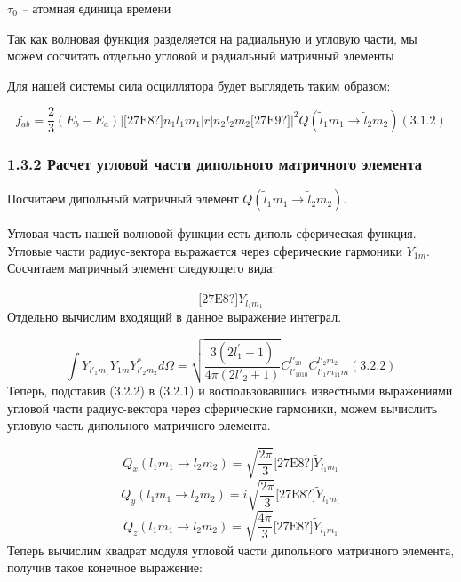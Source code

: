 \documentclass[a4paper]{article}
\begin{document}
 $\tau _0$\textit{ -- }атомная
единица времени

Так как волновая функция разделяется на радиальную и угловую части, мы можем сосчитать отдельно угловой и радиальный матричный элементы

Для нашей системы сила осциллятора будет выглядеть таким образом:

\begin{equation*}
f_{\mathit{ab}}=\frac 2
3\left(E_b-E_a\right)\left|\text{[27E8?]}n_1l_1m_1\left|r\left|n_2l_2m_2\text{[27E9?]}\right.\right.\right|^2Q\left(\widetilde
l_1m_1\rightarrow \widetilde l_2m_2\right)(3.1.2)
\end{equation*}
\subsubsection[1.3.2 Расчет угловой
части дипольного матричного
элемента]{1.3.2 Расчет
угловой части дипольного матричного
элемента}
\hypertarget{RefHeading4691463868395}{}Посчитаем
дипольный матричный
элемент  $Q\left(\widetilde l_1m_1\rightarrow \widetilde l_2m_2\right)$.

Угловая часть нашей волновой функции есть диполь-сферическая функция. Угловые части радиус-вектора выражается через сферические
гармоники  $Y_{1m}$.
Сосчитаем матричный элемент следующего вида:

\begin{equation*}
\text{[27E8?]}\widetilde Y_{l_1m_1}
\end{equation*}
Отдельно вычислим входящий в данное выражение интеграл.

\begin{equation*}
	\int Y_{l'_1m_1}Y_{1m}Y_{l'_2m_2}^{\ast }\mathit{d\Omega }=
	\sqrt{
		\frac{3(2l^{'}_{1}+1)}{4\pi (2l{'}_2 +1)}
	}
	C_{l{'}_{1010}}^{l{'}_{20}}C_{l{'}_1 m_11 m}^{l{'}_2m_2}
	(3.2.2)
\end{equation*}
Теперь, подставив (3.2.2) в (3.2.1) и воспользовавшись известными выражениями угловой части радиус-вектора через сферические гармоники, можем вычислить угловую часть дипольного матричного элемента.

\begin{equation*}
Q_x\left(l_1m_1\rightarrow l_2m_2\right)=\sqrt{\frac{2\pi } 3}\text{[27E8?]}\widetilde Y_{l_1m_1}
\end{equation*}
\begin{equation*}
Q_y\left(l_1m_1\rightarrow l_2m_2\right)=i\sqrt{\frac{2\pi } 3}\text{[27E8?]}\widetilde Y_{l_1m_1}
\end{equation*}
\begin{equation*}
Q_z\left(l_1m_1\rightarrow l_2m_2\right)=\sqrt{\frac{4\pi } 3}\text{[27E8?]}\widetilde Y_{l_1m_1}
\end{equation*}
Теперь вычислим квадрат модуля угловой части дипольного матричного элемента, получив такое конечное выражение:
\end{document}
